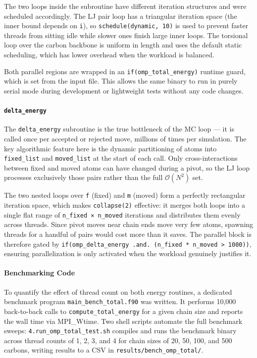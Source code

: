 \documentclass[
]{article}
\begin{document}
The two loops inside the subroutine have different iteration structures
and were scheduled accordingly. The LJ pair loop has a triangular
iteration space (the inner bound depends on \texttt{i}), so
\texttt{schedule(dynamic,\ 10)} is used to prevent faster threads from
sitting idle while slower ones finish large inner loops. The torsional
loop over the carbon backbone is uniform in length and uses the default
static scheduling, which has lower overhead when the workload is
balanced.

Both parallel regions are wrapped in an \texttt{if(omp\_total\_energy)}
runtime guard, which is set from the input file. This allows the same
binary to run in purely serial mode during development or lightweight
tests without any code changes.

\paragraph{\texorpdfstring{\texttt{delta\_energy}}{delta\_energy}}\label{delta_energy}

The \texttt{delta\_energy} subroutine is the true bottleneck of the MC
loop --- it is called once per accepted or rejected move, millions of
times per simulation. The key algorithmic feature here is the dynamic
partitioning of atoms into \texttt{fixed\_list} and \texttt{moved\_list}
at the start of each call. Only cross-interactions between fixed and
moved atoms can have changed during a pivot, so the LJ loop processes
exclusively those pairs rather than the full \(\mathcal{O}(N^2)\) set.

The two nested loops over \texttt{f} (fixed) and \texttt{m} (moved) form
a perfectly rectangular iteration space, which makes
\texttt{collapse(2)} effective: it merges both loops into a single flat
range of \texttt{n\_fixed\ ×\ n\_moved} iterations and distributes them
evenly across threads. Since pivot moves near chain ends move very few
atoms, spawning threads for a handful of pairs would cost more than it
saves. The parallel block is therefore gated by
\texttt{if(omp\_delta\_energy\ .and.\ (n\_fixed\ *\ n\_moved\ \textgreater{}\ 1000))},
ensuring parallelization is only activated when the workload genuinely
justifies it.

\paragraph{Benchmarking Code}\label{benchmarking-code}

To quantify the effect of thread count on both energy routines, a
dedicated benchmark program \texttt{main\_bench\_total.f90} was written.
It performs 10,000 back-to-back calls to \texttt{compute\_total\_energy}
for a given chain size and reports the wall time via MPI\_Wtime. Two
shell scripts automate the full benchmark sweeps:
\texttt{4.run\_omp\_total\_test.sh} compiles and runs the benchmark
binary across thread counts of 1, 2, 3, and 4 for chain sizes of 20, 50,
100, and 500 carbons, writing results to a CSV in
\texttt{results/bench\_omp\_total/}.
\end{document}
